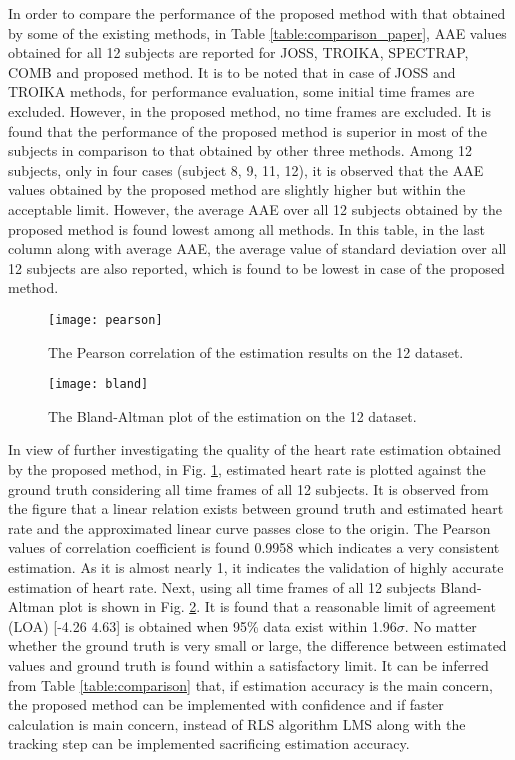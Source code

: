 \documentclass[final,3p,times,authoryear]{elsarticle}
\begin{document}
In order to compare the performance of the proposed method with that obtained by some of the existing methods, in Table \ref{table:comparison_paper}, AAE values obtained for all 12 subjects are reported for JOSS, TROIKA, SPECTRAP, COMB and proposed method. It is to be noted that in case of JOSS and TROIKA methods, for performance evaluation, some initial time frames are excluded. However, in the proposed method, no time frames are excluded. It is found that the performance of the proposed method is superior in most of the subjects in comparison to that obtained by other three methods. Among 12 subjects, only in four cases (subject 8, 9, 11, 12), it is observed that the AAE values obtained by the proposed method are slightly higher but within the acceptable limit. However, the average AAE over all 12 subjects obtained by the proposed method is found lowest among all methods. In this table, in the last column along with average AAE, the average value of standard deviation over all 12 subjects are also reported, which is found to be lowest in case of the proposed method. \\

\begin{figure}[h]
  \centering
  \texttt{[image: pearson]}\\
  \caption{The Pearson correlation of the estimation results on the 12 dataset.}\label{Fig:pearson}
\end{figure}

\begin{figure}[h]
  \centering
  \texttt{[image: bland]}\\
  \caption{The Bland-Altman plot of the estimation on the 12 dataset.}\label{Fig:bland}
\end{figure}
 
In view of further investigating the quality of the heart rate estimation obtained by the proposed method, in Fig. \ref{Fig:pearson}, estimated heart rate is plotted against the ground truth considering all time frames of all 12 subjects. It is observed from the figure that a linear relation exists between ground truth and estimated heart rate and the approximated linear curve passes close to the origin.
The Pearson values of correlation coefficient is found 0.9958 which indicates a very consistent estimation. As it is almost nearly 1, it indicates the validation of highly accurate estimation of heart rate. Next, using all time frames of all 12  subjects Bland-Altman plot is shown in Fig. \ref{Fig:bland}. It is found that a reasonable limit of agreement (LOA) [-4.26 4.63] is obtained when 95\% data exist within 1.96$\sigma$. No matter whether the ground truth is very small or large, the difference between estimated values and ground truth is found within a satisfactory limit. It can be inferred from Table \ref{table:comparison} that, if estimation accuracy is the main concern, the proposed method can be implemented with confidence and if faster calculation is main concern, instead of RLS algorithm LMS along with the tracking step can be implemented sacrificing estimation accuracy. 
\end{document}
